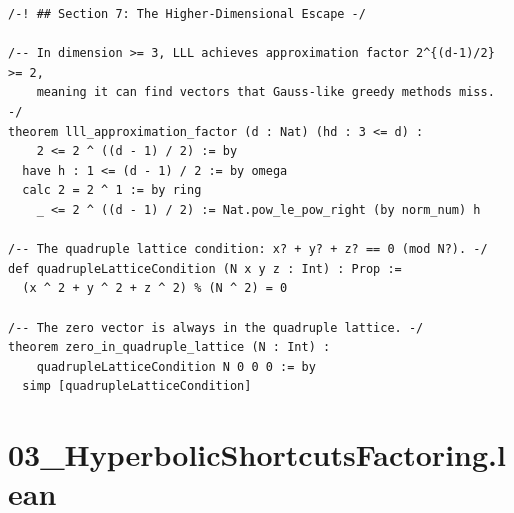 \documentclass[11pt,twoside,openright]{book}
\theoremstyle{definition}
\theoremstyle{remark}
\begin{document}
\begin{lstlisting}[style=lean]
/-! ## Section 7: The Higher-Dimensional Escape -/

/-- In dimension >= 3, LLL achieves approximation factor 2^{(d-1)/2} >= 2,
    meaning it can find vectors that Gauss-like greedy methods miss. -/
theorem lll_approximation_factor (d : Nat) (hd : 3 <= d) :
    2 <= 2 ^ ((d - 1) / 2) := by
  have h : 1 <= (d - 1) / 2 := by omega
  calc 2 = 2 ^ 1 := by ring
    _ <= 2 ^ ((d - 1) / 2) := Nat.pow_le_pow_right (by norm_num) h

/-- The quadruple lattice condition: x? + y? + z? == 0 (mod N?). -/
def quadrupleLatticeCondition (N x y z : Int) : Prop :=
  (x ^ 2 + y ^ 2 + z ^ 2) % (N ^ 2) = 0

/-- The zero vector is always in the quadruple lattice. -/
theorem zero_in_quadruple_lattice (N : Int) :
    quadrupleLatticeCondition N 0 0 0 := by
  simp [quadrupleLatticeCondition]

\end{lstlisting}

\clearpage

\section*{03\_HyperbolicShortcutsFactoring.lean}
\end{document}
